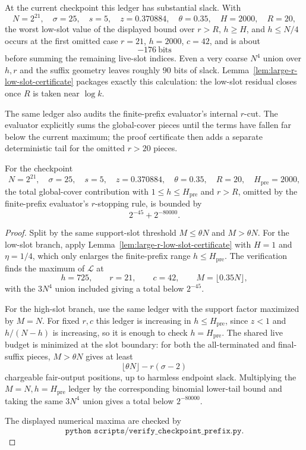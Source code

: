 At the current checkpoint this ledger has substantial slack.  With
\[
N=2^{21},\quad
\sigma=25,\quad
s=5,\quad
z=0.370884,\quad
\theta=0.35,\quad
H=2000,\quad
R=20,
\]
the worst low-slot value of the displayed bound over \(r>R\), \(h\ge H\), and \(h\le N/4\) occurs at the first omitted
case \(r=21\), \(h=2000\), \(c=42\), and is about
\[
-176\ \text{bits}
\]
before summing the remaining live-slot indices.  Even a very coarse \(N^4\) union over \(h,r\) and the suffix
geometry leaves roughly \(90\) bits of slack.  Lemma~\ref{lem:large-r-low-slot-certificate} packages exactly this
calculation: the low-slot residual closes once \(R\) is taken near \(\log k\).

The same ledger also audits the finite-prefix evaluator's internal \(r\)-cut.  The evaluator explicitly sums the
global-cover pieces until the terms have fallen far below the current maximum; the proof certificate then adds a
separate deterministic tail for the omitted \(r>20\) pieces.

\begin{lemma}
\label{lem:prefix-large-r-stopping-tail}
For the checkpoint
\[
N=2^{21},\quad
\sigma=25,\quad
s=5,\quad
z=0.370884,\quad
\theta=0.35,\quad
R=20,\quad
H_{\mathrm{pre}}=2000,
\]
the total global-cover contribution with \(1\le h\le H_{\mathrm{pre}}\) and \(r>R\), omitted by the finite-prefix
evaluator's \(r\)-stopping rule, is bounded by
\[
2^{-45}+2^{-80000}.
\]
\end{lemma}

\begin{proof}
Split by the same support-slot threshold \(M\le\theta N\) and \(M>\theta N\).  For the low-slot branch, apply
Lemma~\ref{lem:large-r-low-slot-certificate} with \(H=1\) and \(\eta=1/4\), which only enlarges the finite-prefix range
\(h\le H_{\mathrm{pre}}\).  The verification finds the maximum of
\(\mathcal{L}\) at
\[
h=725,\qquad r=21,\qquad c=42,\qquad M=\lfloor0.35N\rfloor,
\]
with the \(3N^4\) union included giving a total below \(2^{-45}\).

For the high-slot branch, use the same ledger with the support factor maximized by \(M=N\).  For fixed \(r,c\) this
ledger is increasing in \(h\le H_{\mathrm{pre}}\), since \(z<1\) and \(h/(N-h)\) is increasing, so it is enough to check
\(h=H_{\mathrm{pre}}\).  The shared live budget is minimized at the slot boundary: for both the all-terminated and
final-suffix pieces, \(M>\theta N\) gives at least
\[
\lfloor\theta N\rfloor-r(\sigma-2)
\]
chargeable fair-output positions, up to harmless endpoint slack.  Multiplying the \(M=N,h=H_{\mathrm{pre}}\) ledger by
the corresponding binomial lower-tail bound and taking the same \(3N^4\) union gives a total below \(2^{-80000}\).

The displayed numerical maxima are checked by
\[
\texttt{python scripts/verify\_checkpoint\_prefix.py}.
\]
\end{proof}

